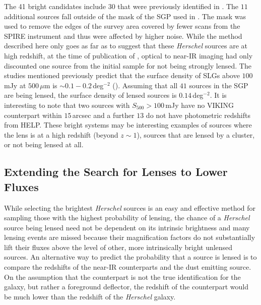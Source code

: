 The 41 bright candidates include $30$ that were previously identified in \citealt{Negrello_2017}. The $11$ additional sources fall outside of the mask of the SGP used in \citealt{Negrello_2017}. The mask was used to remove the edges of the survey area covered by fewer scans from the SPIRE instrument and thus were affected by higher noise. While the method described here only goes as far as to suggest that these \textit{Herschel} sources are at high redshift, at the time of publication of \citealt{Negrello_2017}, optical to near-IR imaging had only discounted one source from the initial sample for not being strongly lensed. The studies mentioned previously predict that the surface density of SLGs above $100\,$mJy at $500\,\mu$m is $\sim 0.1 - 0.2\,$deg$^{-2}$ (\citealt{Vieira_2010, Wardlow_2013, Nayyeri_2016}). Assuming that all $41$ sources in the SGP are being lensed, the surface density of lensed sources is $0.14\,$deg$^{-2}$. It is interesting to note that two sources with $S_{500} > 100\,$mJy have no VIKING counterpart within $15\,$arcsec and a further $13$ do not have photometric redshifts from HELP. These bright systems may be interesting examples of sources where the lens is at a high redshift (beyond $z \sim 1$), sources that are lensed by a cluster, or not being lensed at all.

\subsection{Extending the Search for Lenses to Lower Fluxes}

While selecting the brightest \textit{Herschel} sources is an easy and effective method for sampling those with the highest probability of lensing, the chance of a \textit{Herschel} source being lensed need not be dependent on its intrinsic brightness and many lensing events are missed because their magnification factors do not substantially lift their fluxes above the level of other, more intrinsically bright unlensed sources. An alternative way to predict the probability that a source is lensed is to compare the redshifts of the near-IR counterparts and the dust emitting source. On the assumption that the counterpart is not the true identification for the galaxy, but rather a foreground deflector, the redshift of the counterpart would be much lower than the redshift of the \textit{Herschel} galaxy.

